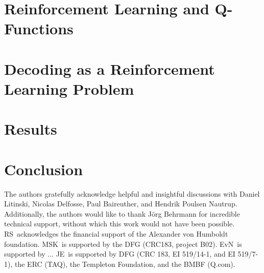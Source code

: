 \documentclass[onecolumn,preprintnumbers,amsmath,amssymb,notitlepage,nofootinbib,longbibliography,superscriptaddress,aps,pra,10pt]{revtex4-1}
\begin{document}
\section{Reinforcement Learning and Q-Functions}\label{s:reinforcement_learning}
\section{Decoding as a Reinforcement Learning Problem}\label{s:decoding_as_rl}
\section{Results}\label{s:results}
\section{Conclusion}\label{s:conclusions}


\begin{acknowledgments}
	The authors gratefully acknowledge helpful and insightful discussions with Daniel Litinski, Nicolas Delfosse, Paul Baireuther, and Hendrik Poulsen Nautrup.
	Additionally, the authors would like to thank J\"{o}rg Behrmann for incredible technical support, without which this work would not have been possible.
	RS\ acknowledges the financial support of the Alexander von Humboldt foundation.
	MSK\ is supported by the DFG (CRC183, project B02).
	EvN\ is supported by ...
	JE\ is supported by DFG (CRC 183, EI 519/14-1, and EI 519/7-1), the ERC (TAQ), the Templeton Foundation, and the BMBF (Q.com).
\end{acknowledgments}


\end{document}
